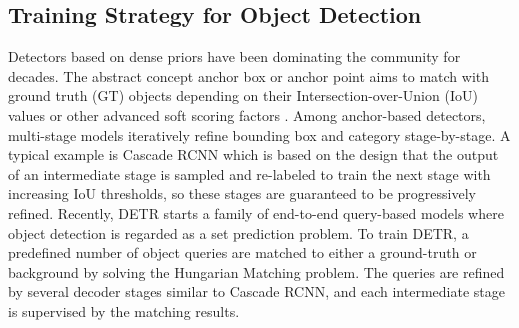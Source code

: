 \documentclass[10pt,twocolumn,letterpaper]{article}
\begin{document}
\subsection{Training Strategy for Object Detection}


Detectors based on dense priors have been dominating the community for decades. The abstract concept anchor box or anchor point \cite{Ren2015FasterRT, Tian2019FCOSFC} aims to match with ground truth (GT) objects depending on their Intersection-over-Union (IoU) values or other advanced soft scoring factors \cite{Lin2017FocalLF, Tian2019FCOSFC, Kim2020ProbabilisticAA, Zhu2020SoftAO, feng2021tood}. Among anchor-based detectors, multi-stage models iteratively refine bounding box and category stage-by-stage. A typical example is Cascade RCNN \cite{Cai2018CascadeRD} which is based on the design that the output of an intermediate stage is sampled and re-labeled to train the next stage with increasing IoU thresholds, so these stages are guaranteed to be progressively refined. Recently, DETR \cite{Carion2020EndtoEndOD} starts a family of end-to-end query-based models where object detection is regarded as a set prediction problem. 
To train DETR, a predefined number of object queries are matched to either a ground-truth or background by solving the Hungarian Matching problem. The queries are refined by several decoder stages similar to Cascade RCNN, and each intermediate stage is supervised by the matching results.  
\end{document}
